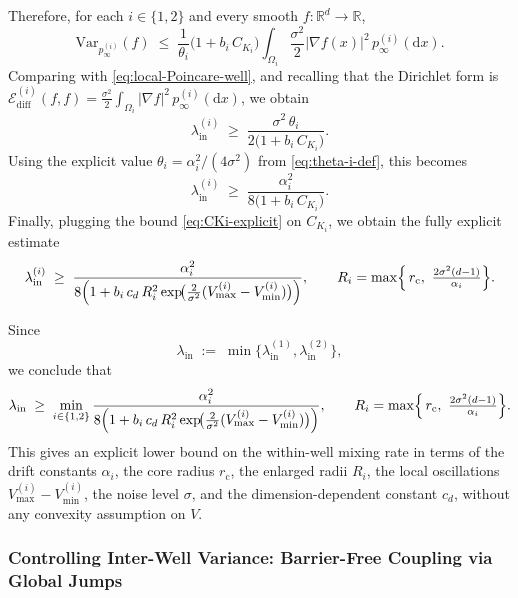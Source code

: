 Therefore, for each \(i\in\{1,2\}\) and every smooth
\(f:\mathbb R^d\to\mathbb R\),
\[
\mathrm{Var}_{p_\infty^{(i)}}(f)
\;\le\;
\frac{1}{\theta_i}\bigl(1 + b_i\,C_{K_i}\bigr)
\int_{\Omega_i} \frac{\sigma^2}{2}|\nabla f(x)|^2\,p_\infty^{(i)}(\mathrm dx).
\]
Comparing with \eqref{eq:local-Poincare-well}, and recalling that the
Dirichlet form is
\(
\mathcal E_{\mathrm{diff}}^{(i)}(f,f)
=
\tfrac{\sigma^2}{2}\int_{\Omega_i}|\nabla f|^2\,p_\infty^{(i)}(\mathrm dx)
\),
we obtain
\begin{equation}\label{eq:lambda-in-i-lower-bound-general}
\lambda_{\mathrm{in}}^{(i)}
\;\ge\;
\frac{\sigma^2\,\theta_i}{2\bigl(1 + b_i\,C_{K_i}\bigr)}.
\end{equation}
Using the explicit value \(\theta_i=\alpha_i^2/(4\sigma^2)\) from
\eqref{eq:theta-i-def}, this becomes
\begin{equation}\label{eq:lambda-in-i-lower-bound-CK}
\lambda_{\mathrm{in}}^{(i)}
\;\ge\;
\frac{\alpha_i^2}{
8\bigl(1 + b_i\,C_{K_i}\bigr)}.
\end{equation}
Finally, plugging the bound \eqref{eq:CKi-explicit} on \(C_{K_i}\), we obtain
the fully explicit estimate
\begin{equation}\label{eq:lambda-in-i-lower-bound-fully-explicit}
\lambda_{\mathrm{in}}^{(i)}
\;\ge\;
\frac{\alpha_i^2}{
8\Bigl(1 + b_i\,c_d\,R_i^2
\exp\!\bigl(\tfrac{2}{\sigma^2}(V_{\max}^{(i)}-V_{\min}^{(i)})\bigr)\Bigr)},
\qquad
R_i = \max\Bigl\{\,r_{\mathrm c},\ \tfrac{2\sigma^2(d-1)}{\alpha_i}\Bigr\}.
\end{equation}

Since
\[
\lambda_{\mathrm{in}}
\;:=\;
\min\bigl\{\lambda_{\mathrm{in}}^{(1)},\lambda_{\mathrm{in}}^{(2)}\bigr\},
\]
we conclude that
\begin{equation}\label{eq:lambda-in-global-explicit}
\lambda_{\mathrm{in}}
\;\ge\;
\min_{i\in\{1,2\}}
\frac{\alpha_i^2}{
8\Bigl(1 + b_i\,c_d\,R_i^2
\exp\!\bigl(\tfrac{2}{\sigma^2}(V_{\max}^{(i)}-V_{\min}^{(i)})\bigr)\Bigr)},
\qquad
R_i = \max\Bigl\{\,r_{\mathrm c},\ \tfrac{2\sigma^2(d-1)}{\alpha_i}\Bigr\}.
\end{equation}
This gives an explicit lower bound on the within-well mixing rate in terms
of the drift constants \(\alpha_i\), the core radius \(r_{\mathrm c}\), the enlarged
radii \(R_i\), the local oscillations \(V_{\max}^{(i)}-V_{\min}^{(i)}\), the noise
level \(\sigma\), and the dimension-dependent constant \(c_d\), without any
convexity assumption on \(V\).


\subsubsection{Controlling Inter-Well Variance: Barrier-Free Coupling via Global Jumps}
\label{sec:lambda-inter}

